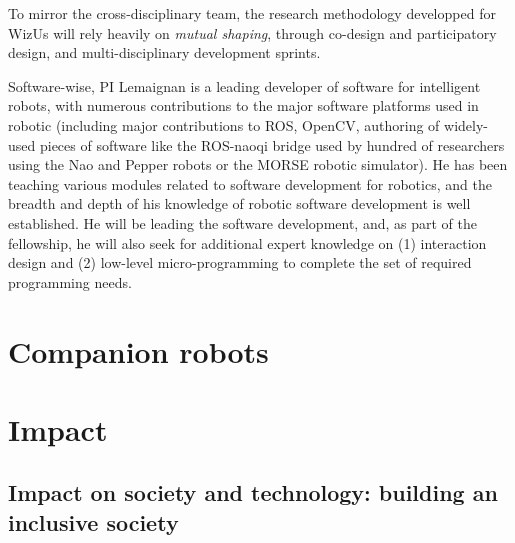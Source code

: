 \documentclass[11pt,a4paper]{report}
\newcommand{\project}{WizUs\xspace}
\begin{document}
To mirror the cross-disciplinary team, the research methodology developped for
\project will rely heavily on \emph{mutual shaping}, through co-design and
participatory design, and multi-disciplinary development sprints.

Software-wise, PI Lemaignan is a leading developer of software for intelligent
robots, with numerous contributions to the major software platforms used in
robotic (including major contributions to ROS, OpenCV, authoring of widely-used
pieces of software like the ROS-naoqi bridge used by hundred of researchers
using the Nao and Pepper robots or the MORSE robotic simulator). He has been
teaching various modules related to software development for robotics, and the
breadth and depth of his knowledge of robotic software development is well
established. He will be leading the software development, and, as part of the
fellowship, he will also seek for additional expert knowledge on (1) interaction
design and (2) low-level micro-programming to complete the set of required
programming needs.






\section{Companion robots}

\section{Impact}\label{impact}

\subsection{Impact on society and technology: building an inclusive society}
\end{document}
